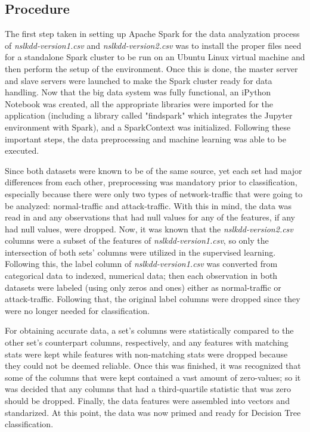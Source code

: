 \documentclass[a4paper,12pt]{IEEEtran}
\begin{document}
\subsection{Procedure}
The first step taken in setting up Apache Spark for the data analyzation process of \textit{nslkdd-version1.csv} and \textit{nslkdd-version2.csv} was to install the proper files need for a standalone Spark cluster to be run on an Ubuntu Linux virtual machine and then perform the setup of the environment. Once this is done, the master server and slave servers were launched to make the Spark cluster ready for data handling. Now that the big data system was fully functional, an iPython Notebook was created, all the appropriate libraries were imported for the application (including a library called "findspark" which integrates the Jupyter environment with Spark), and a SparkContext was initialized. Following these important steps, the data preprocessing and machine learning was able to be executed.

Since both datasets were known to be of the same source, yet each set had major differences from each other, preprocessing was mandatory prior to classification, especially because there were only two types of network-traffic that were going to be analyzed: normal-traffic and attack-traffic. With this in mind, the data was read in and any observations that had null values for any of the features, if any had null values, were dropped. Now, it was known that the \textit{nslkdd-version2.csv} columns were a subset of the features of \textit{nslkdd-version1.csv}, so only the intersection of both sets' columns were utilized in the supervised learning. Following this, the label column of \textit{nslkdd-version1.csv} was converted from categorical data to indexed, numerical data; then each observation in both datasets were labeled (using only zeros and ones) either as normal-traffic or attack-traffic. Following that, the original label columns were dropped since they were no longer needed for classification.

For obtaining accurate data, a set's columns were statistically compared to the other set's counterpart columns, respectively, and any features with matching stats were kept while features with non-matching stats were dropped because they could not be deemed reliable. Once this was finished, it was recognized that some of the columns that were kept contained a vast amount of zero-values; so it was decided that any columns that had a third-quartile statistic that was zero should be dropped. Finally, the data features were assembled into vectors and standarized. At this point, the data was now primed and ready for Decision Tree classification.
\end{document}
